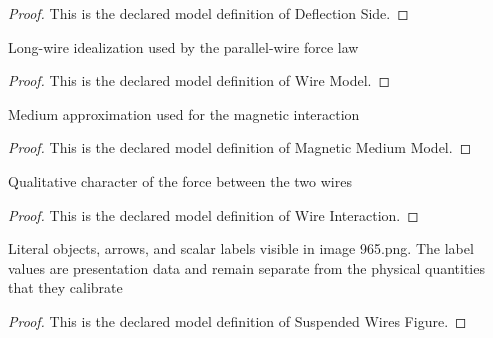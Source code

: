 \begin{proof}
  This is the declared model definition of Deflection Side.
\end{proof}
\begin{definition}
  \label{def:physics:phyx-mini-0965:phyxminiproblems-problemphyxmini0965-wiremodel}
  Long-wire idealization used by the parallel-wire force law
\end{definition}
\begin{proof}
  This is the declared model definition of Wire Model.
\end{proof}
\begin{definition}
  \label{def:physics:phyx-mini-0965:phyxminiproblems-problemphyxmini0965-magneticmediummodel}
  Medium approximation used for the magnetic interaction
\end{definition}
\begin{proof}
  This is the declared model definition of Magnetic Medium Model.
\end{proof}
\begin{definition}
  \label{def:physics:phyx-mini-0965:phyxminiproblems-problemphyxmini0965-wireinteraction}
  Qualitative character of the force between the two wires
\end{definition}
\begin{proof}
  This is the declared model definition of Wire Interaction.
\end{proof}
\begin{definition}
  \label{def:physics:phyx-mini-0965:phyxminiproblems-problemphyxmini0965-suspendedwiresfigure}
  Literal objects, arrows, and scalar labels visible in image 965.png. The label values are presentation data and remain separate from the physical quantities that they calibrate
\end{definition}
\begin{proof}
  This is the declared model definition of Suspended Wires Figure.
\end{proof}
